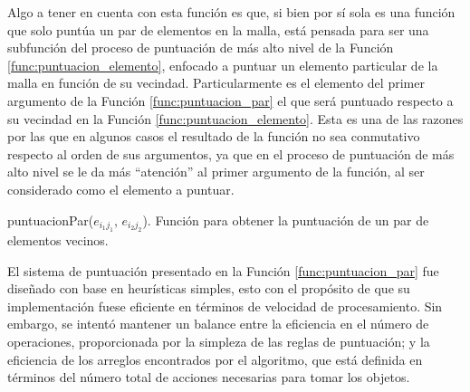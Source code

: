 Algo a tener en cuenta con esta función es que, si bien por sí sola es una función que solo puntúa un par de elementos en la malla, está pensada para ser una subfunción del proceso de puntuación de más alto nivel de la Función \ref{func:puntuacion_elemento}, enfocado a puntuar un elemento particular de la malla en función de su vecindad.
Particularmente es el elemento del primer argumento de la Función \ref{func:puntuacion_par} el que será puntuado respecto a su vecindad en la Función \ref{func:puntuacion_elemento}.
Esta es una de las razones por las que en algunos casos el resultado de la función no sea conmutativo respecto al orden de sus argumentos, ya que en el proceso de puntuación de más alto nivel se le da más ``atención'' al primer argumento de la función, al ser considerado como el elemento a puntuar.
%
\begin{center}
\begin{minipage}{0.9\textwidth}
\begin{function}[H]
	\label{func:puntuacion_par}%
	\caption{puntuacionPar($e_{i_1 j_1}$, $e_{i_2 j_2}$). Función para obtener la puntuación de un par de elementos vecinos.}%
	\OneHalfBlankLine
	\OneHalfBlankLine
\end{function}
\end{minipage}
\end{center}
%
El sistema de puntuación presentado en la Función \ref{func:puntuacion_par} fue diseñado con base en heurísticas simples, esto con el propósito de que su implementación fuese eficiente en términos de velocidad de procesamiento.
Sin embargo, se intentó mantener un balance entre la eficiencia en el número de operaciones, proporcionada por la simpleza de las reglas de puntuación; y la eficiencia de los arreglos encontrados por el algoritmo, que está definida en términos del número total de acciones necesarias para tomar los objetos.

